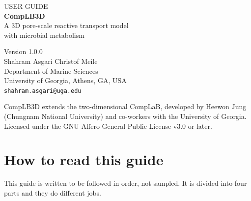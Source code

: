 \documentclass[11pt,a4paper]{report}
\begin{document}
\begin{titlepage}
\centering
\vspace*{2.2cm}

{\color{cbGrey}\large USER GUIDE}\\[6pt]
{\color{cbBlue}\Huge\bfseries CompLB3D}\\[10pt]
{\color{cbBlue}\large A 3D pore-scale reactive transport model\\ with microbial metabolism}\\[26pt]


\vspace{22pt}
{\large Version 1.0.0}\\[26pt]

{\large Shahram Asgari \quad\textbullet\quad Christof Meile}\\[6pt]
{\small Department of Marine Sciences\\ University of Georgia, Athens, GA, USA\\[4pt]
\texttt{shahram.asgari@uga.edu}}

\vfill

{\small\color{cbGrey}
CompLB3D extends the two-dimensional CompLaB, developed by Heewon Jung\\
(Chungnam National University) and co-workers with the University of Georgia.\\[10pt]
Licensed under the GNU Affero General Public License v3.0 or later.}

\vspace{10pt}
\end{titlepage}

\chapter*{How to read this guide}

This guide is written to be followed in order, not sampled. It is divided into
four parts and they do different jobs.
\end{document}
